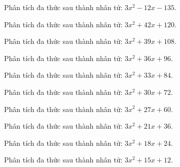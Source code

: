 \begin{bt}
	Phân tích đa thức sau thành nhân tử: $3 x^2 - 12 x - 135$.
\end{bt}
\begin{bt}
	Phân tích đa thức sau thành nhân tử: $3 x^2 + 42 x + 120$.
\end{bt}
\begin{bt}
	Phân tích đa thức sau thành nhân tử: $3 x^2 + 39 x + 108$.
\end{bt}
\begin{bt}
	Phân tích đa thức sau thành nhân tử: $3 x^2 + 36 x + 96$.
\end{bt}
\begin{bt}
	Phân tích đa thức sau thành nhân tử: $3 x^2 + 33 x + 84$.
\end{bt}
\begin{bt}
	Phân tích đa thức sau thành nhân tử: $3 x^2 + 30 x + 72$.
\end{bt}
\begin{bt}
	Phân tích đa thức sau thành nhân tử: $3 x^2 + 27 x + 60$.
\end{bt}
\begin{bt}
	Phân tích đa thức sau thành nhân tử: $3 x^2 + 21 x + 36$.
\end{bt}
\begin{bt}
	Phân tích đa thức sau thành nhân tử: $3 x^2 + 18 x + 24$.
\end{bt}
\begin{bt}
	Phân tích đa thức sau thành nhân tử: $3 x^2 + 15 x + 12$.
\end{bt}
